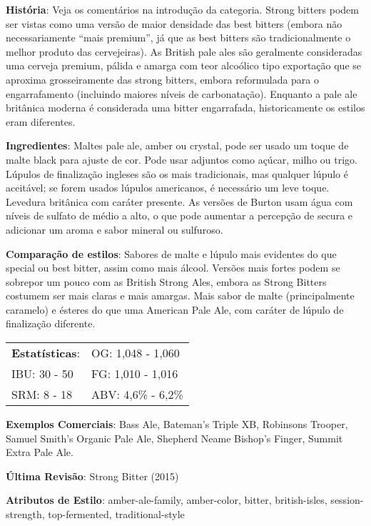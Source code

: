 \textbf{História}: Veja os comentários na introdução da categoria. Strong bitters podem ser vistas como uma versão de maior densidade das best bitters (embora não necessariamente “mais premium”, já que as best bitters são tradicionalmente o melhor produto das cervejeiras). As British pale ales são geralmente consideradas uma cerveja premium, pálida e amarga com teor alcoólico tipo exportação que se aproxima grosseiramente das strong bitters, embora reformulada para o engarrafamento (incluindo maiores níveis de carbonatação). Enquanto a pale ale britânica moderna é considerada uma bitter engarrafada, historicamente os estilos eram diferentes.

\textbf{Ingredientes}: Maltes pale ale, amber ou crystal, pode ser usado um toque de malte black para ajuste de cor. Pode usar adjuntos como açúcar, milho ou trigo. Lúpulos de finalização ingleses são os mais tradicionais, mas qualquer lúpulo é aceitável; se forem usados lúpulos americanos, é necessário um leve toque. Levedura britânica com caráter presente. As versões de Burton usam água com níveis de sulfato de médio a alto, o que pode aumentar a percepção de secura e adicionar um aroma e sabor mineral ou sulfuroso.

\textbf{Comparação de estilos}: Sabores de malte e lúpulo mais evidentes do que special ou best bitter, assim como mais álcool. Versões mais fortes podem se sobrepor um pouco com as British Strong Ales, embora as Strong Bitters costumem ser mais claras e mais amargas. Mais sabor de malte (principalmente caramelo) e ésteres do que uma American Pale Ale, com caráter de lúpulo de finalização diferente.

\begin{tabular}{@{}p{35mm}p{35mm}@{}}
  \textbf{Estatísticas}: & OG: 1,048 - 1,060 \\
  IBU: 30 - 50  & FG: 1,010 - 1,016  \\
  SRM: 8 - 18  & ABV: 4,6\% - 6,2\%
\end{tabular}

\textbf{Exemplos Comerciais}: Bass Ale, Bateman’s Triple XB, Robinsons Trooper, Samuel Smith’s Organic Pale Ale, Shepherd Neame Bishop's Finger, Summit Extra Pale Ale.

\textbf{Última Revisão}: Strong Bitter (2015)

\textbf{Atributos de Estilo}: amber-ale-family, amber-color, bitter, british-isles, session-strength, top-fermented, traditional-style